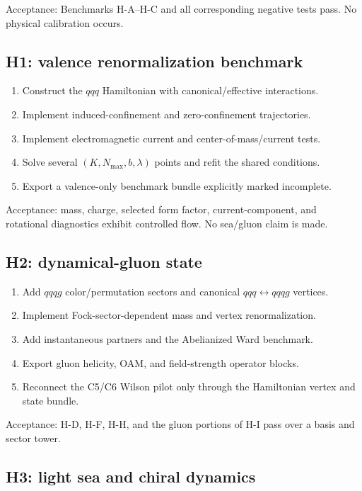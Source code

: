 \documentclass[11pt]{article}
\begin{document}
Acceptance: Benchmarks H-A--H-C and all corresponding negative tests pass.
No physical calibration occurs.

\subsection{H1: valence renormalization benchmark}

\begin{enumerate}
 \item Construct the \(qqq\) Hamiltonian with canonical/effective interactions.
 \item Implement induced-confinement and zero-confinement trajectories.
 \item Implement electromagnetic current and center-of-mass/current tests.
 \item Solve several \((K,N_{\max},b,\lambda)\) points and refit the shared
 conditions.
 \item Export a valence-only benchmark bundle explicitly marked incomplete.
\end{enumerate}

Acceptance: mass, charge, selected form factor, current-component, and
rotational diagnostics exhibit controlled flow.  No sea/gluon claim is made.

\subsection{H2: dynamical-gluon state}

\begin{enumerate}
 \item Add \(qqqg\) color/permutation sectors and canonical
 \(qqq\leftrightarrow qqqg\) vertices.
 \item Implement Fock-sector-dependent mass and vertex renormalization.
 \item Add instantaneous partners and the Abelianized Ward benchmark.
 \item Export gluon helicity, OAM, and field-strength operator blocks.
 \item Reconnect the C5/C6 Wilson pilot only through the Hamiltonian vertex and
 state bundle.
\end{enumerate}

Acceptance: H-D, H-F, H-H, and the gluon portions of H-I pass over a basis and
sector tower.

\subsection{H3: light sea and chiral dynamics}
\end{document}
